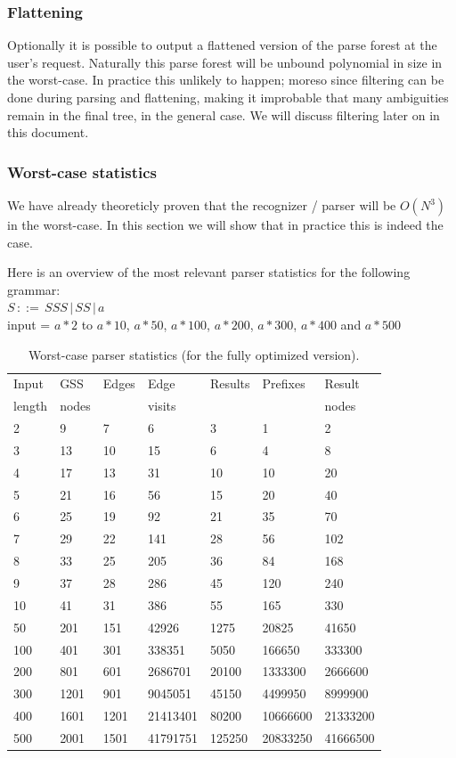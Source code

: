 \documentclass[a4paper,10pt]{article}
\begin{document}
\subsubsection{Flattening}
Optionally it is possible to output a flattened version of the parse forest at the user's request. Naturally this parse forest will be unbound polynomial in size in the worst-case. In practice this unlikely to happen; moreso since filtering can be done during parsing and flattening, making it improbable that many ambiguities remain in the final tree, in the general case. We will discuss filtering later on in this document.

\subsubsection{Worst-case statistics}
We have already theoreticly proven that the recognizer / parser will be $O(N^3)$ in the worst-case. In this section we will show that in practice this is indeed the case.

Here is an overview of the most relevant parser statistics for the following grammar:\\
$S\,::=\,SSS\,|\,SS\,|\,a$\\
input = $a * 2$ to $a * 10$, $a * 50$, $a * 100$, $a * 200$, $a * 300$, $a * 400$ and $a * 500$

\begin{table}[H]
\centering
\begin{tabular}{ | p{7ex} | p{7ex} | p{7ex} | p{10ex} | p{8ex} | p{10ex} | p{10ex} | }
  \hline
  Input & GSS & Edges & Edge & Results & Prefixes & Result \\
  length & nodes & & visits & & & nodes \\
  \hline
  2 & 9 & 7 & 6 & 3 & 1 & 2 \\
  3 & 13 & 10 & 15 & 6 & 4 & 8 \\
  4 & 17 & 13 & 31 & 10 & 10 & 20 \\
  5 & 21 & 16 & 56 & 15 & 20 & 40 \\
  6 & 25 & 19 & 92 & 21 & 35 & 70 \\
  7 & 29 & 22 & 141 & 28 & 56 & 102 \\
  8 & 33 & 25 & 205 & 36 & 84 & 168 \\
  9 & 37 & 28 & 286 & 45 & 120 & 240 \\
  10 & 41 & 31 & 386 & 55 & 165 & 330 \\
  \hline
  50 & 201 & 151 & 42926 & 1275 & 20825 & 41650 \\
  100 & 401 & 301 & 338351 & 5050 & 166650 & 333300 \\
  200 & 801 & 601 & 2686701 & 20100 & 1333300 & 2666600 \\
  300 & 1201 & 901 & 9045051 & 45150 & 4499950 & 8999900 \\
  400 & 1601 & 1201 & 21413401 & 80200 & 10666600 & 21333200 \\
  500 & 2001 & 1501 & 41791751 & 125250 & 20833250 & 41666500 \\
  \hline
\end{tabular}
\caption{Worst-case parser statistics (for the fully optimized version).}
\end{table}
\end{document}
